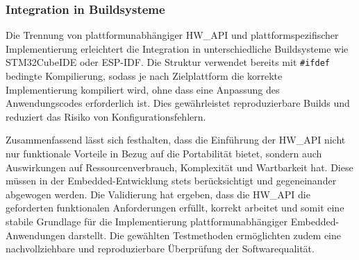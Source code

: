 \subsubsection{Integration in Buildsysteme}
Die Trennung von plattformunabhängiger HW\_API und plattformspezifischer Implementierung erleichtert die Integration in unterschiedliche Buildsysteme wie STM32CubeIDE oder ESP-IDF. 
Die Struktur verwendet bereits mit \texttt{\#ifdef} bedingte Kompilierung, sodass je nach Zielplattform die korrekte Implementierung kompiliert wird, ohne dass eine Anpassung des Anwendungscodes erforderlich ist. 
Dies gewährleistet reproduzierbare Builds und reduziert das Risiko von Konfigurationsfehlern.

\vspace{1cm}
Zusammenfassend lässt sich festhalten, dass die Einführung der HW\_API nicht nur funktionale Vorteile in Bezug auf die Portabilität bietet, sondern auch Auswirkungen auf Ressourcenverbrauch, Komplexität und Wartbarkeit hat. 
Diese müssen in der Embedded-Entwicklung stets berücksichtigt und gegeneinander abgewogen werden. 
Die Validierung hat ergeben, dass die HW\_API die geforderten funktionalen Anforderungen erfüllt, korrekt arbeitet und somit eine stabile Grundlage für die Implementierung plattformunabhängiger Embedded-Anwendungen darstellt. 
Die gewählten Testmethoden ermöglichten zudem eine nachvollziehbare und reproduzierbare Überprüfung der Softwarequalität.






























